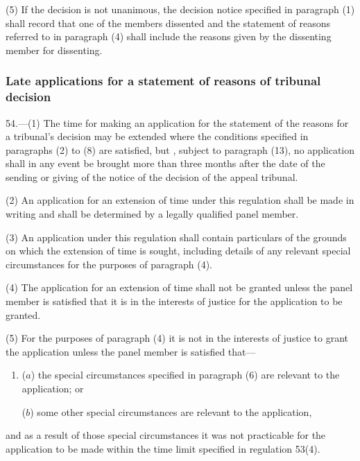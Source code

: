 \documentclass[12pt,a4paper]{article}
\begin{document}
(5) If the decision is not unanimous, the decision notice specified in paragraph (1) shall record that one of the members dissented and the statement of reasons referred to in paragraph (4) shall include the reasons given by the dissenting member for dissenting.


\subsubsection[54. Late applications for a statement of reasons of tribunal decision]{Late applications for a statement of reasons of tribunal decision}

54.—(1) The time for making an application for 
the statement of the reasons for a tribunal’s decision may be extended where the conditions specified in paragraphs (2) to (8) are satisfied, but%
, subject to paragraph (13),  %
no application shall in any event be brought more than three months after the date of the sending or giving of the notice of the decision of the appeal tribunal.

(2) An application for an extension of time under this regulation shall be made in writing and shall be determined by a legally qualified panel member.

(3) An application under this regulation shall contain particulars of the grounds on which the extension of time is sought, including details of any relevant special circumstances for the purposes of paragraph (4).

(4) The application for an extension of time shall not be granted unless the panel member is satisfied that it is in the interests of justice for the application to be granted.

(5) For the purposes of paragraph (4) it is not in the interests of justice to grant the application unless the panel member is satisfied that—
\begin{enumerate}\item[]
($a$) the special circumstances specified in paragraph (6) are relevant to the application; or

($b$) some other special circumstances are relevant to the application,
\end{enumerate}
and as a result of those special circumstances it was not practicable for the application to be made within the time limit specified in regulation 53(4).
\end{document}
